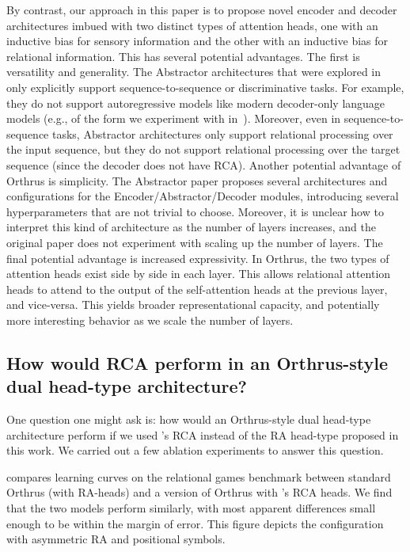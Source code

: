 By contrast, our approach in this paper is to propose novel encoder and decoder architectures imbued with two distinct types of attention heads, one with an inductive bias for sensory information and the other with an inductive bias for relational information. This has several potential advantages. The first is versatility and generality. The Abstractor architectures that were explored in~\citep{altabaa2024abstractors} only explicitly support sequence-to-sequence or discriminative tasks. For example, they do not support autoregressive models like modern decoder-only language models (e.g., of the form we experiment with in~). Moreover, even in sequence-to-sequence tasks, Abstractor architectures only support relational processing over the input sequence, but they do not support relational processing over the target sequence (since the decoder does not have RCA). Another potential advantage of Orthrus is simplicity. The Abstractor paper proposes several architectures and configurations for the Encoder/Abstractor/Decoder modules, introducing several hyperparameters that are not trivial to choose. Moreover, it is unclear how to interpret this kind of architecture as the number of layers increases, and the original paper does not experiment with scaling up the number of layers. The final potential advantage is increased expressivity. In Orthrus, the two types of attention heads exist side by side in each layer. This allows relational attention heads to attend to the output of the self-attention heads at the previous layer, and vice-versa. This yields broader representational capacity, and potentially more interesting behavior as we scale the number of layers.

\subsection{How would RCA perform in an Orthrus-style dual head-type architecture?}

One question one might ask is: how would an Orthrus-style dual head-type architecture perform if we used \citet{altabaa2024abstractors}'s RCA instead of the RA head-type proposed in this work. We carried out a few ablation experiments to answer this question.

 compares learning curves on the relational games benchmark between standard Orthrus (with RA-heads) and a version of Orthrus with \citet{altabaa2024abstractors}'s RCA heads. We find that the two models perform similarly, with most apparent differences small enough to be within the margin of error. This figure depicts the configuration with asymmetric RA and positional symbols.


